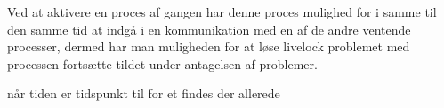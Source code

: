 Ved at aktivere en proces af gangen har denne proces mulighed for i samme til 
den  samme tid at indgå i en kommunikation med en af de andre ventende 
processer, dermed har man muligheden for at løse livelock problemet med
processen fortsætte  tildet under antagelsen af problemer.




når tiden er  tidspunkt
til for et findes der allerede  
